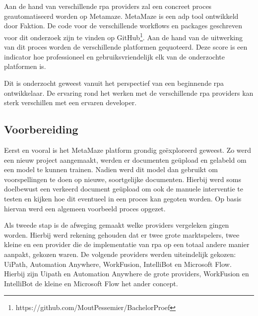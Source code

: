
\chapter{}
\label{ch:methodologie}

Aan de hand van verschillende \acrshort{rpa} providers zal een concreet proces geautomatiseerd worden op Metamaze. MetaMaze is een \acrfull{adp} tool ontwikkeld door Faktion. De code voor de verschillende workflows en packages geschreven voor dit onderzoek zijn te vinden op GitHub\footnote{https://github.com/MoutPessemier/BachelorProef}. Aan de hand van de uitwerking van dit proces worden de verschillende platformen gequoteerd. Deze score is een indicator hoe professioneel en gebruiksvriendelijk elk van de onderzochte platformen is.

Dit is onderzocht geweest vanuit het perspectief van een beginnende \acrshort{rpa} ontwikkelaar. De ervaring rond het werken met de verschillende \acrshort{rpa} providers kan sterk verschillen met een ervaren developer.


\section{Voorbereiding}
Eerst en vooral is het MetaMaze platform grondig geëxploreerd geweest. Zo werd een nieuw project aangemaakt, werden er documenten geüpload en gelabeld om een model te kunnen trainen. Nadien werd dit model dan gebruikt om voorspellingen te doen op nieuwe, soortgelijke documenten. Hierbij werd soms doelbewust een verkeerd document geüpload om ook de manuele interventie te testen en kijken hoe dit eventueel in een proces kan gegoten worden. Op basis hiervan werd een algemeen voorbeeld proces opgezet.

Als tweede stap is de afweging gemaakt welke providers vergeleken gingen worden. Hierbij werd rekening gehouden dat er twee grote marktspelers, twee kleine en een provider die de implementatie van \acrshort{rpa} op een totaal andere manier aanpakt, gekozen waren. De volgende providers werden uiteindelijk gekozen: UiPath, Automation Anywhere, WorkFusion, IntelliBot en Microsoft Flow. Hierbij zijn Uipath en Automation Anywhere de grote providers, WorkFusion en IntelliBot de kleine en Microsoft Flow het ander concept.

